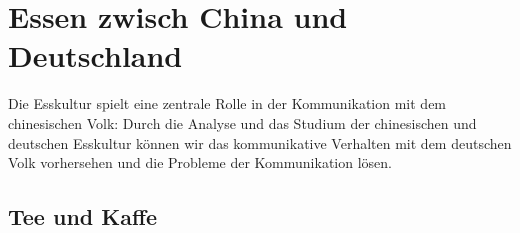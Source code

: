 \chapter{Essen zwisch China und Deutschland}
\startcontents[chapters]
\color{blue}
\hspace{4cm}
\noindent\hspace{-2cm}
\cleardoubleemptypage
Die Esskultur spielt eine zentrale Rolle in der Kommunikation mit dem chinesischen Volk: Durch die Analyse und das Studium der chinesischen und deutschen Esskultur können wir das kommunikative Verhalten mit dem deutschen Volk vorhersehen und die Probleme der Kommunikation lösen.
\section{Tee und Kaffe}